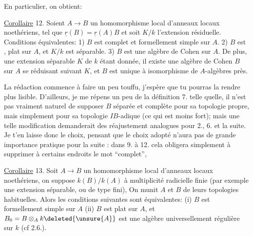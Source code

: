 
En particulier, on obtient:

\uline{Corollaire} 12. Soient $A\longrightarrow B$ un homomorphisme local d'anneaux locaux
noethériens, tel que $\underline{r}(B)=\underline{r}(A)B$ et  soit $K/k$ l'extension
résiduelle. Conditions équivalentes: 1) $B$ est complet et formellement
simple sur $A$. 2) $B$ est , plat sur $A$, et $K/k$ est séparable.
3) $B$ est une algèbre de Cohen sur $A$. De plus, une extension séparable
$K$ de $k$ étant donnée, il existe une algèbre de Cohen $B$ sur $A$ se réduisant
suivant $K$, et $B$ est unique à isomorphisme de $A$-algèbres près.

La rédaction commence à faire un peu touffu, j'espère que tu pourras
la rendre plus lisible. D'ailleurs, je me répens un peu de la définition
7. telle quelle, il n'est pas vraiment naturel de supposer $B$ séparée
et complète pour sa topologie propre, mais simplement pour sa topologie
$IB$-adique (ce qui est moins fort); mais une telle modification demanderait
des réajustement analogues pour 2., 6. et la suite. Je t'en laisse
donc le choix, pensant que le choix adopté n'aura pas de grande importance
pratique pour la suite : dans 9. à 12. cela obligera simplement à
supprimer à certains endroits le mot ``complet'',




\uline{Corollaire} 13. Soit $A\longrightarrow B$ un homomorphisme local d'anneaux locaux
noethériens, on suppose $k(B)/k(A)$ à multiplicité radicielle finie
(par exemple une extension séparable, ou de type fini),
  On
munit $A$ et $B$ de leurs topologies habituelles. Alors les conditions suivantes
sont équivalentes: (i) $B$ est formellement simple sur $A$ (ii) $B$ est
plat sur $A$, et $B_0=B\otimes_A k\deleted{\unsure{A}}$ est une algèbre universellement régulière sur
$k$ (cf 2.6.).

